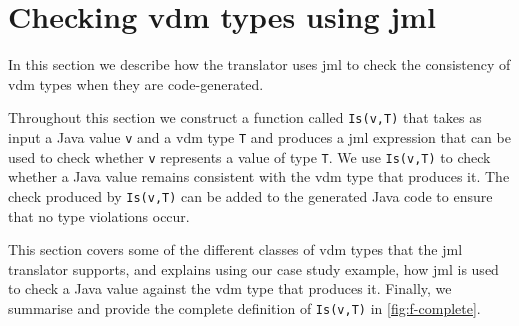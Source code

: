 \section{Checking \ac{vdm} types using \ac{jml}}
\label{sec:sl-types-gen}

In this section we describe how the translator uses \ac{jml} to check
the consistency of \ac{vdm} types when they are code-generated.

Throughout this section we construct a function called
\texttt{Is(v,T)} that takes as input a Java value \texttt{v} and a
\ac{vdm} type \texttt{T} and produces a \ac{jml} expression that can
be used to check whether \texttt{v} represents a value of type
\texttt{T}. We use \texttt{Is(v,T)} to check whether a Java value
remains consistent with the \ac{vdm} type that produces it. The
check produced by \texttt{Is(v,T)} can be added to the generated Java
code to ensure that no type violations occur.

This section covers some of the different classes of \ac{vdm} types
that the \ac{jml} translator supports, and explains using our case
study example, how \ac{jml} is used to check a Java value against the
\ac{vdm} type that produces it.  Finally, we summarise and provide the
complete definition of \texttt{Is(v,T)} in \autoref{fig:f-complete}.

%
%
\newcommand\caseSpace{1pt}
\newcommand\caseSpaceSeqSet{14.0\caseSpace}
\newcommand\caseSpaceMap{20.0\caseSpace}

